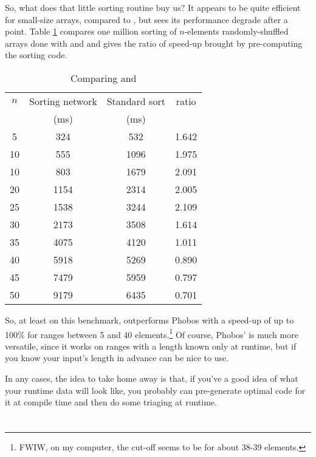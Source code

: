 So, what does that little sorting routine buy us? It appears to be quite efficient for small-size arrays, compared to , but sees its performance degrade after a point. Table \ref{table:sortingnetworkperformance} compares one million sorting of $n$-elements randomly-shuffled arrays done with  and  and gives the ratio of speed-up brought by pre-computing the sorting code. 

\begin{table}[htb]
\centering
\begin{tabular}[c]{|c|c|c|c|}
\hline
$n$ & Sorting network & Standard sort & ratio \\
    & (ms)            & (ms)          &       \\ \hline \hline
5  & 324  & 532  & 1.642 \\ \hline
10 & 555  & 1096 & 1.975 \\ \hline
10 & 803  & 1679 & 2.091 \\ \hline
20 & 1154 & 2314 & 2.005 \\ \hline
25 & 1538 & 3244 & 2.109 \\ \hline
30 & 2173 & 3508 & 1.614 \\ \hline
35 & 4075 & 4120 & 1.011 \\ \hline
40 & 5918 & 5269 & 0.890 \\ \hline
45 & 7479 & 5959 & 0.797 \\ \hline
50 & 9179 & 6435 & 0.701 \\ \hline
\end{tabular}
\caption{Comparing  and }
\label{table:sortingnetworkperformance}
\end{table}

So, at least on this benchmark,  outperforms Phobos with a speed-up of up to 100\% for ranges between 5 and 40 elements.\footnote{ FWIW, on my computer, the cut-off seems to be for about 38-39 elements.} Of course, Phobos'  is much more versatile, since it works on ranges with a length known only at runtime, but if you know your input's length in advance  can be nice to use.

In any cases, the idea to take home away is that, if you've a good idea of what your runtime data will look like, you probably can pre-generate optimal code for it at compile time and then do some triaging at runtime.

\section{\texorpdfstring{}
                        {\_\_traits}}
\label{traits}

